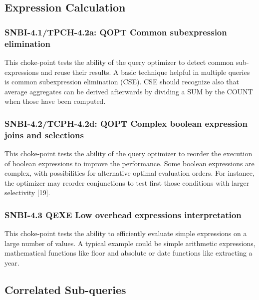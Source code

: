 \subsection{Expression Calculation}

\subsubsection{SNBI-4.1/TPCH-4.2a: QOPT Common subexpression elimination}
\label{choke_point_4.1}
This choke-point tests the ability of the query optimizer to detect common sub-expressions and reuse their results. A basic technique helpful in multiple queries is common subexpression elimination (CSE). 
CSE should recognize also that average aggregates can be derived afterwards by dividing a SUM by the COUNT when those have been computed.

\subsubsection{SNBI-4.2/TCPH-4.2d: QOPT Complex boolean expression joins and selections}
\label{choke_point_4.2}
This choke-point tests the ability of the query optimizer to reorder the execution of boolean expressions to improve the performance. Some boolean expressions are complex, with possibilities for alternative optimal evaluation orders. 
For instance, the optimizer may reorder conjunctions to test first those conditions with larger selectivity [19].

\subsubsection{SNBI-4.3 QEXE Low overhead expressions interpretation}
\label{choke_point_4.3}
This choke-point tests the ability to efficiently evaluate simple expressions on a large number of values. A typical example could be simple arithmetic expressions, mathematical functions like floor and absolute or date functions like extracting a year.

\subsection{Correlated Sub-queries}


